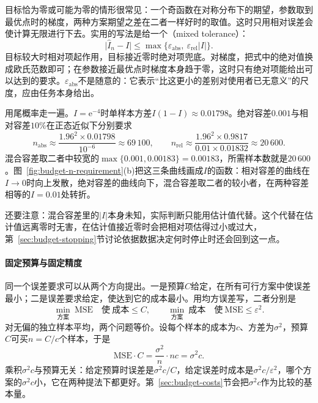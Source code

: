 目标恰为零或可能为零的情形很常见：一个奇函数在对称分布下的期望，参数取到最优点时的梯度，两种方案期望之差在二者一样好时的取值。这时只用相对误差会使计算无限进行下去。实用的写法是给一个（mixed tolerance）：
\begin{equation}
  \lvert\hat{I}_n-I\rvert\le\max\bigl\{\varepsilon_{\mathrm{abs}},\ \varepsilon_{\mathrm{rel}}\lvert I\rvert\bigr\} .
  \label{eq:budget-mixed-tolerance}
\end{equation}
目标较大时相对项起作用，目标接近零时绝对项兜底。对梯度，把式中的绝对值换成欧氏范数即可；在参数接近最优点时梯度本身趋于零，这时只有绝对项能给出可以达到的要求。$\varepsilon_{\mathrm{abs}}$不是随意的：它表示“比这更小的差别对使用者已无意义”的尺度，应由任务本身给出。

用尾概率走一遍。$I=\mathrm{e}^{-4}$时单样本方差$I(1-I)\approx0.01798$。绝对容差$0.001$与相对容差$10\%$在正态近似下分别要求
\[
  n_{\mathrm{abs}}\approx\frac{1.96^{2}\times0.01798}{10^{-6}}\approx69\,100,\qquad n_{\mathrm{rel}}\approx\frac{1.96^{2}\times0.9817}{0.01\times0.01832}\approx20\,600 .
\]
混合容差取二者中较宽的$\max\{0.001,0.00183\}=0.00183$，所需样本数就是$20\,600$。图~\ref{fig:budget-n-requirement}(b)把这三条曲线画成$I$的函数：相对容差的曲线在$I\to0$时向上发散，绝对容差的曲线向下，混合容差取二者的较小者，在两种容差相等的$I=0.01$处转折。

还要注意：混合容差里的$\lvert I\rvert$本身未知，实际判断只能用估计值代替。这个代替在估计值远离零时无害，在估计值接近零时会把相对项估得过小或过大，第~\ref{sec:budget-stopping}节讨论依据数据决定何时停止时还会回到这一点。

\paragraph{固定预算与固定精度}
同一个误差要求可以从两个方向提出。一是预算$C$给定，在所有可行方案中使误差最小；二是误差要求给定，使达到它的成本最小。用均方误差写，二者分别是
\begin{equation}
  \min_{\text{方案}}\ \mathrm{MSE}\quad\text{使}\ \text{成本}\le C,
  \qquad
  \min_{\text{方案}}\ \text{成本}\quad\text{使}\ \mathrm{MSE}\le\varepsilon^{2}.
  \label{eq:budget-two-problems}
\end{equation}
对无偏的独立样本平均，两个问题等价。设每个样本的成本为$c$、方差为$\sigma^{2}$，预算$C$可买$n=C/c$个样本，于是
\begin{equation}
  \mathrm{MSE}\cdot C=\frac{\sigma^{2}}{n}\cdot nc=\sigma^{2}c .
  \label{eq:budget-mse-cost-product}
\end{equation}
乘积$\sigma^{2}c$与预算无关：给定预算时误差是$\sigma^{2}c/C$，给定误差时成本是$\sigma^{2}c/\varepsilon^{2}$，哪个方案的$\sigma^{2}c$小，它在两种提法下都更好。第~\ref{sec:budget-costs}节会把$\sigma^{2}c$作为比较的基本量。


